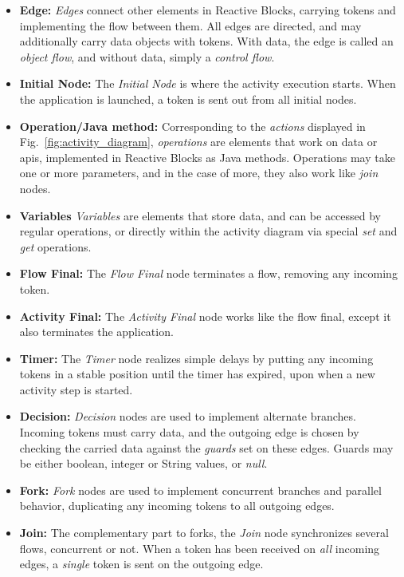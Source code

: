 \begin{itemize}
	\item{\textbf{Edge:}} \emph{Edges} connect other elements in Reactive Blocks, carrying tokens and implementing the flow between them. All edges are directed, and may additionally carry data objects with tokens. With data, the edge is called an \emph{object flow}, and without data, simply a \emph{control flow}.
	\item{\textbf{Initial Node:}} The \emph{Initial Node} is where the activity execution starts. When the application is launched, a token is sent out from all initial nodes.
	\item{\textbf{Operation/Java method:}} Corresponding to the \emph{actions} displayed in Fig.~\ref{fig:activity_diagram}, \emph{operations} are elements that work on data or \glspl{api}, implemented in Reactive Blocks as Java methods. Operations may take one or more parameters, and in the case of more, they also work like \emph{join} nodes.
	\item{\textbf{Variables}} \emph{Variables} are elements that store data, and can be accessed by regular operations, or directly within the activity diagram via special \emph{set} and \emph{get} operations.
	\item{\textbf{Flow Final:}} The \emph{Flow Final} node terminates a flow, removing any incoming token.
	\item{\textbf{Activity Final:}} The \emph{Activity Final} node works like the flow final, except it also terminates the application.
	\item{\textbf{Timer:}} The \emph{Timer} node realizes simple delays by putting any incoming tokens in a stable position until the timer has expired, upon when a new activity step is started.
	\item{\textbf{Decision:}} \emph{Decision} nodes are used to implement alternate branches. Incoming tokens must carry data, and the outgoing edge is chosen by checking the carried data against the \emph{guards} set on these edges. Guards may be either boolean, integer or String values, or \emph{null}.
	\item{\textbf{Fork:}} \emph{Fork} nodes are used to implement concurrent branches and parallel behavior, duplicating any incoming tokens to all outgoing edges.
	\item{\textbf{Join:}} The complementary part to forks, the \emph{Join} node synchronizes several flows, concurrent or not. When a token has been received on \emph{all} incoming edges, a \emph{single} token is sent on the outgoing edge.

\end{itemize}
